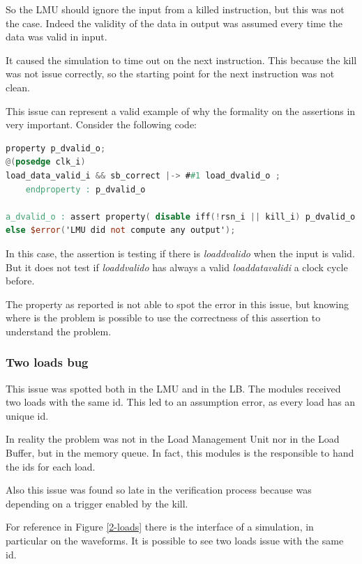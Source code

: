 So the LMU should ignore the input from a killed instruction, but this was not the case. Indeed the validity of the data in output was assumed every time the data was valid in input.

It caused the simulation to time out on the next instruction. This because the kill was not issue correctly, so the starting point for the next instruction was not clean.

This issue can represent a valid example of why the formality on the assertions in very important.
Consider the following code:


\linespread{1}
\begin{lstlisting}[language=Verilog,style=verilog-style, backgroundcolor=\color{lyel_palette}, frame=tlb]
property p_dvalid_o;
@(posedge clk_i)
load_data_valid_i && sb_correct |-> ##1 load_dvalid_o ;
	endproperty : p_dvalid_o

a_dvalid_o : assert property( disable iff(!rsn_i || kill_i) p_dvalid_o )
else $error('LMU did not compute any output');
\end{lstlisting}
\linespread{1.2}

In this case, the assertion is testing if there is \emph{load\+dvalid\+o} when the input is valid. But it does not test if \emph{load\+dvalid\+o} has always a valid \emph{load\+data\+valid\+i} a clock cycle before.

The property as reported is not able to spot the error in this issue, but knowing where is the problem is possible to use the correctness of this assertion to understand the problem.

\subsubsection{Two loads bug}
This issue was spotted both in the LMU and in the LB. The modules received two loads with the same id. This led to an assumption error, as every load has an unique id.

In reality the problem was not in the Load Management Unit nor in the Load Buffer, but in the memory queue. In fact, this modules is the responsible to hand the ids for each load.

Also this issue was found so late in the verification process because was depending on a trigger enabled by the kill.

For reference in Figure \ref{2-loads} there is the interface of a simulation, in particular on the waveforms. It is possible to see two loads issue with the same id.

